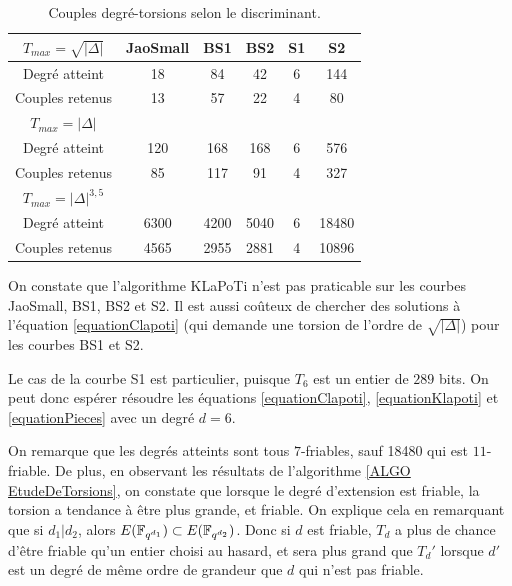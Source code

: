 \begin{table}[h]
	\begin{center}
		\begin{tabular}{|c|c|c|c|c|c|}
			\hline
			$T_{max} = \sqrt{|\Delta|}$	& JaoSmall & BS1 & BS2 & S1 & S2 \\
			\hline
			Degré atteint	& 18 & 84 & 42 & 6 & 144 \\
			\hline
			Couples retenus	& 13 & 57 & 22 & 4 & 80 \\
			\hline
			\hline
		$T_{max} = |\Delta|$	&  &  &  &  &  \\
			\hline
		Degré atteint	& 120 & 168 & 168 & 6 & 576 \\
			\hline
		Couples retenus	& 85 & 117 & 91 & 4 & 327 \\
			\hline
			\hline
		$T_{max} = |\Delta|^{3,5}$	&  &  &  &  &  \\
			\hline
		Degré atteint	& 6300 & 4200 & 5040 & 6 & 18480 \\
			\hline
		Couples retenus	& 4565 & 2955 & 2881 & 4 & 10896  \\
			\hline
		\end{tabular}
	\end{center}
	\caption{Couples degré-torsions selon le discriminant.}
	\label{tableEtudeTorsion}
\end{table}

On constate que l'algorithme KLaPoTi n'est pas praticable sur les courbes JaoSmall, BS1, BS2 et S2. Il est aussi coûteux de chercher des solutions à l'équation \eqref{equationClapoti} (qui demande une torsion de l'ordre de $\sqrt{|\Delta|}$) pour les courbes BS1 et S2. 

Le cas de la courbe S1 est particulier, puisque $T_{6}$ est un entier de $289$ bits. On peut donc espérer résoudre les équations \eqref{equationClapoti}, \eqref{equationKlapoti} et \eqref{equationPieces} avec un degré $d = 6$. 

On remarque que les degrés atteints sont tous $7$-friables, sauf 18480 qui est $11$-friable. De plus, en observant les résultats de l'algorithme \ref{ALGO EtudeDeTorsions}, on constate que lorsque le degré d'extension est friable, la torsion a tendance à être plus grande, et friable. On explique cela en remarquant que si $d_1|d_2$, alors $E(\mathbb{F}_{q^{d_1}})\subset E(\mathbb{F}_{q^{d_2}})$. Donc si $d$ est friable, $T_d$ a plus de chance d'être friable qu'un entier choisi au hasard, et sera plus grand que $T_d'$ lorsque $d'$ est un degré de même ordre de grandeur que $d$ qui n'est pas friable.

